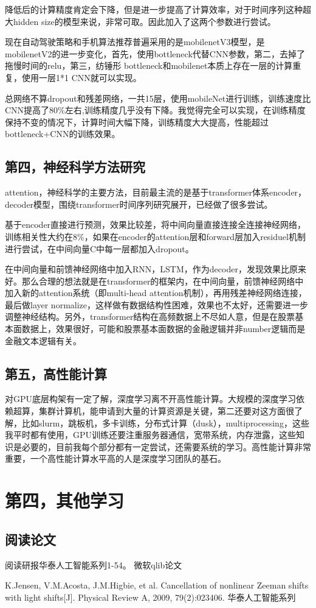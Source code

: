 \documentclass[11pt]{ctexart}
\begin{document}
降低后的计算精度肯定会下降，但是进一步提高了计算效率，对于时间序列这种超大hidden size的模型来说，非常可取。因此加入了这两个参数进行尝试。

现在自动驾驶策略和手机算法推荐普遍采用的是mobilenetV3模型，是mobilenetV2的进一步变化，首先，使用bottleneck代替CNN参数，第二，去掉了拖慢时间的relu，第三，纺锤形
bottleneck和mobilenet本质上存在一层的计算重复，使用一层1*1 CNN就可以实现。

总网络不算dropout和残差网络，一共15层，使用mobileNet进行训练，训练速度比CNN提高了80\%左右,训练精度几乎没有下降。我觉得完全可以实现，在训练精度保持不变的情况下，计算时间大幅下降，训练精度大大提高，性能超过bottleneck+CNN的训练效果。



\subsection{第四，神经科学方法研究}
attention，神经科学的主要方法，目前最主流的是基于transformer体系encoder，decoder模型，围绕transformer时间序列研究展开，已经做了很多尝试。

基于encoder直接进行预测，效果比较差，将中间向量直接连接全连接神经网络，训练相关性大约在8\%，如果在encoder的attention层和forward层加入residuel机制进行尝试，在中间向量C中每一层都加入dropout。

在中间向量和前馈神经网络中加入RNN，LSTM，作为decoder，发现效果比原来好。那么合理的想法就是在transformer的框架内，在中间向量，前馈神经网络中加入新的attention系统（即multi-head attention机制），再用残差神经网络连接，最后做layer normalize，这样做有数据结构性困难，效果也不太好，还需要进一步调整神经结构。另外，transformer结构在高频数据上不尽如人意，但是在股票基本面数据上，效果很好，可能和股票基本面数据的金融逻辑并非number逻辑而是金融文本逻辑有关。

\subsection{第五，高性能计算}
对GPU底层构架有一定了解，深度学习离不开高性能计算。大规模的深度学习依赖超算，集群计算机，能申请到大量的计算资源是关键，第二还要对这方面很了解，比如slurm，跳板机，多卡训练，分布式计算（dusk），multiprocessing，这些我平时都有使用，GPU训练还要注重服务器通信，宽带系统，内存泄露，这些知识是必要的，目前我每个部分都有一定尝试，还需要系统的学习。高性能计算非常重要，一个高性能计算水平高的人是深度学习团队的基石。

\section{第四，其他学习}
\subsection{阅读论文}
阅读研报华泰人工智能系列1-54。
微软qlib论文

\begin{thebibliography}{1}
 K.Jensen, V.M.Acosta, J.M.Higbie, et al. Cancellation of nonlinear Zeeman shifts with light shifts[J]. Physical Review A, 2009, 79(2):023406.
 华泰人工智能系列
\end{thebibliography}
\end{document}
